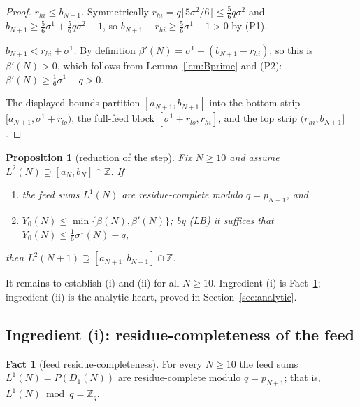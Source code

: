 \documentclass[11pt]{amsart}
\theoremstyle{plain}
\newtheorem{proposition}[theorem]{Proposition}
\theoremstyle{definition}
\newtheorem{fact}[theorem]{Fact}
\newcommand{\Z}{\mathbb{Z}}
\begin{document}
\begin{proof}
\emph{$r_{hi}\le b_{N+1}$.}  Symmetrically
$r_{hi}=q\lfloor 5\sigma^2/6\rfloor\le\tfrac56 q\sigma^2$ and
$b_{N+1}\ge\tfrac56\sigma^1+\tfrac56 q\sigma^2-1$, so
$b_{N+1}-r_{hi}\ge\tfrac56\sigma^1-1>0$ by (P1).

\emph{$b_{N+1}<r_{hi}+\sigma^1$.}  By definition
$\beta'(N)=\sigma^1-(b_{N+1}-r_{hi})$, so this is $\beta'(N)>0$, which follows from
Lemma~\ref{lem:Bprime} and (P2): $\beta'(N)\ge\tfrac16\sigma^1-q>0$.

The displayed bounds partition $[a_{N+1},b_{N+1}]$ into the bottom strip
$[a_{N+1},\sigma^1+r_{lo})$, the full-feed block $[\sigma^1+r_{lo},r_{hi}]$, and
the top strip $(r_{hi},b_{N+1}]$.
\end{proof}

\begin{proposition}[reduction of the step]\label{prop:step-reduce}
Fix $N\ge 10$ and assume $L^2(N)\supseteq[a_N,b_N]\cap\Z$.  If
\begin{enumerate}[label=\textup{(\roman*)}]
\item the feed sums $L^1(N)$ are residue-complete modulo $q=p_{N+1}$, and
\item $Y_0(N)\le\min\{\beta(N),\beta'(N)\}$; by \textup{(LB)} it suffices that
$Y_0(N)\le\tfrac16\sigma^1(N)-q$,
\end{enumerate}
then $L^2(N+1)\supseteq[a_{N+1},b_{N+1}]\cap\Z$.
\end{proposition}

It remains to establish (i) and (ii) for all $N\ge 10$.  Ingredient (i) is
Fact~\ref{fact:olson-feed}; ingredient (ii) is the analytic heart, proved in
Section~\ref{sec:analytic}.

\subsection{Ingredient (i): residue-completeness of the feed}
\begin{fact}[feed residue-completeness]\label{fact:olson-feed}
For every $N\ge 10$ the feed sums $L^1(N)=P(D_1(N))$ are residue-complete modulo
$q=p_{N+1}$; that is, $L^1(N)\bmod q=\Z_q$.
\end{fact}
\end{document}
